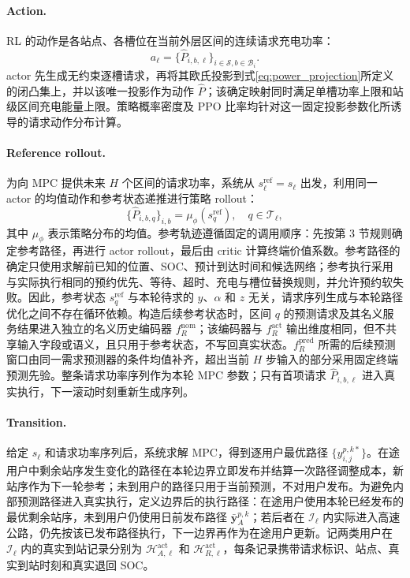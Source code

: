 \documentclass[12pt,a4paper,UTF8]{ctexart}
\begin{document}
\paragraph{Action.}
RL 的动作是各站点、各槽位在当前外层区间的连续请求充电功率：
\begin{equation}
a_\ell=
\{\widehat P_{i,b,\ell}\}_{i\in\mathcal S,b\in\mathcal B_i}.
\label{eq:rl_action}
\end{equation}
actor 先生成无约束逐槽请求，再将其欧氏投影到式\eqref{eq:power_projection}所定义的闭凸集上，并以该唯一投影作为动作 $\widehat P$；该确定映射同时满足单槽功率上限和站级区间充电能量上限。策略概率密度及 PPO 比率均针对这一固定投影参数化所诱导的请求动作分布计算。

\paragraph{Reference rollout.}
为向 MPC 提供未来 $H$ 个区间的请求功率，系统从
$s_{\ell}^{\mathrm{ref}}=s_\ell$ 出发，利用同一 actor 的均值动作和参考状态递推进行策略 rollout：
\begin{equation}
\{\widehat P_{i,b,q}\}_{i,b}
=
\mu_\phi(s_{q}^{\mathrm{ref}}),
\quad q\in\mathcal T_\ell,
\label{eq:rl_power_rollout}
\end{equation}
其中 $\mu_\phi$ 表示策略分布的均值。参考轨迹遵循固定的调用顺序：先按第 3 节规则确定参考路径，再进行 actor rollout，最后由 critic 计算终端价值系数。参考路径的确定只使用求解前已知的位置、SOC、预计到达时间和候选网络；参考执行采用与实际执行相同的预约优先、等待、超时、充电与槽位替换规则，并允许预约软失败。因此，参考状态 $s_q^{\mathrm{ref}}$ 与本轮待求的 $y$、$\alpha$ 和 $z$ 无关，请求序列生成与本轮路径优化之间不存在循环依赖。构造后续参考状态时，区间 $q$ 的预测请求及其名义服务结果进入独立的名义历史编码器 $f_R^{\mathrm{nom}}$；该编码器与 $f_R^{\mathrm{act}}$ 输出维度相同，但不共享输入字段或语义，且只用于参考状态，不写回真实状态。$f_R^{\mathrm{pred}}$ 所需的后续预测窗口由同一需求预测器的条件均值补齐，超出当前 $H$ 步输入的部分采用固定终端预测先验。整条请求功率序列作为本轮 MPC 参数；只有首项请求 $\widehat P_{i,b,\ell}$ 进入真实执行，下一滚动时刻重新生成序列。

\paragraph{Transition.}
给定 $s_\ell$ 和请求功率序列后，系统求解 MPC，得到逐用户最优路径
$\{y_{i,j}^{p,k*}\}$。在途用户中剩余站序发生变化的路径在本轮边界立即发布并结算一次路径调整成本，新站序作为下一轮参考；未到用户的路径只用于当前预测，不对用户发布。为避免内部预测路径进入真实执行，定义边界后的执行路径：在途用户使用本轮已经发布的最优剩余站序，未到用户仍使用日前发布路径 $\bar{\mathbf y}_{A}^{p,k}$；若后者在 $\mathcal I_\ell$ 内实际进入高速公路，仍先按该已发布路径执行，下一边界再作为在途用户更新。记两类用户在 $\mathcal I_\ell$ 内的真实到站记录分别为 $\mathcal H_{A,\ell}^{\mathrm{act}}$ 和 $\mathcal H_{R,\ell}^{\mathrm{act}}$，每条记录携带请求标识、站点、真实到站时刻和真实退回 SOC。
\end{document}
